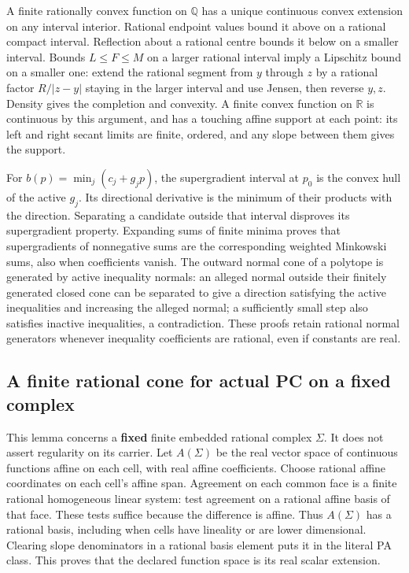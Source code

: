 \documentclass[
  11pt,
]{article}
\begin{document}
A finite rationally convex function on \(\mathbb{Q}\) has a unique
continuous convex extension on any interval interior. Rational endpoint
values bound it above on a rational compact interval. Reflection about a
rational centre bounds it below on a smaller interval. Bounds
\(L\leq F\leq M\) on a larger rational interval imply a Lipschitz bound
on a smaller one: extend the rational segment from \(y\) through \(z\)
by a rational factor \(R/|z-y|\) staying in the larger interval and use
Jensen, then reverse \(y,z\). Density gives the completion and
convexity. A finite convex function on \(\mathbb{R}\) is continuous by
this argument, and has a touching affine support at each point: its left
and right secant limits are finite, ordered, and any slope between them
gives the support.

For \(b(p)=\min_j(c_j+g_jp)\), the supergradient interval at \(p_0\) is
the convex hull of the active \(g_j\). Its directional derivative is the
minimum of their products with the direction. Separating a candidate
outside that interval disproves its supergradient property. Expanding
sums of finite minima proves that supergradients of nonnegative sums are
the corresponding weighted Minkowski sums, also when coefficients
vanish. The outward normal cone of a polytope is generated by active
inequality normals: an alleged normal outside their finitely generated
closed cone can be separated to give a direction satisfying the active
inequalities and increasing the alleged normal; a sufficiently small
step also satisfies inactive inequalities, a contradiction. These proofs
retain rational normal generators whenever inequality coefficients are
rational, even if constants are real.

\subsection{A finite rational cone for actual PC on a fixed
complex}\label{a-finite-rational-cone-for-actual-pc-on-a-fixed-complex}

This lemma concerns a \textbf{fixed} finite embedded rational complex
\(\Sigma\). It does not assert regularity on its carrier. Let
\(A(\Sigma)\) be the real vector space of continuous functions affine on
each cell, with real affine coefficients. Choose rational affine
coordinates on each cell's affine span. Agreement on each common face is
a finite rational homogeneous linear system: test agreement on a
rational affine basis of that face. These tests suffice because the
difference is affine. Thus \(A(\Sigma)\) has a rational basis, including
when cells have lineality or are lower dimensional. Clearing slope
denominators in a rational basis element puts it in the literal PA
class. This proves that the declared function space is its real scalar
extension.
\end{document}
